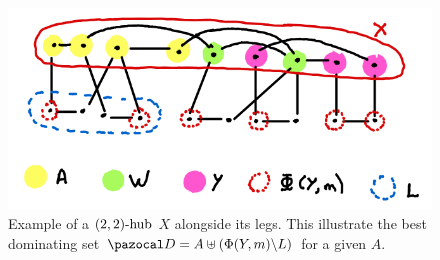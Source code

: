 \begin{figure}
    \centering
    \includegraphics[width=.6\textwidth]{figures/domset-22-proof.png}
    \caption{Example of a $\sdhub[2,2]$ $X$ alongside its legs. This illustrate the best dominating set $\D = A \uplus (\Phi(Y, m) \backslash L)$ for a given $A$.}
    \label{fig:domset-22-proof}
\end{figure}